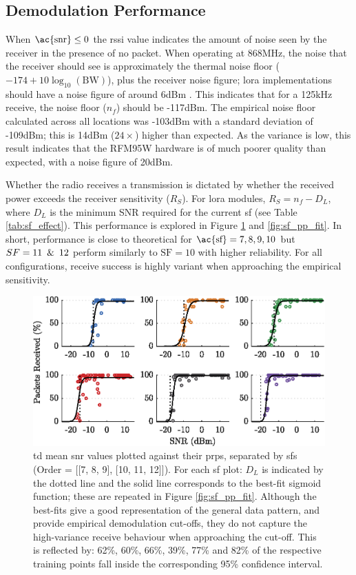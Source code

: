 \subsection{Demodulation Performance}\label{sec:demodulation_performance}
When $\text{\ac{snr}} \leq 0$ the \ac{rssi} value indicates the amount of noise seen by the receiver in the presence of no packet. When operating at 868MHz, the noise that the receiver should see is approximately the thermal noise floor ($-174+10 \log_{10}(\text{BW})$), plus the receiver noise figure; \ac{lora} implementations should have a noise figure of around 6dBm \cite{3YP:LORA_MOD_BASICS}. This indicates that for a 125kHz receive, the noise floor ($n_f$) should be -117dBm. The empirical noise floor calculated across all locations was -103dBm with a standard deviation of -109dBm; this is 14dBm ($24\times$) higher than expected. As the variance is low, this result indicates that the RFM95W hardware is of much poorer quality than expected, with a noise figure of 20dBm.

Whether the radio receives a transmission is dictated by whether the received power exceeds the receiver sensitivity ($R_S$). For \ac{lora} modules, $R_S = n_f - D_L$, where $D_L$ is the minimum SNR required for the current \ac{sf} (see Table \ref{tab:sf_effect}). This performance is explored in Figure \ref{fig:sf_pp_separate} and \ref{fig:sf_pp_fit}. In short, performance is close to theoretical for $\text{\ac{sf}} = 7, 8, 9, 10$ but $SF=11\enskip \& \enskip 12$ perform similarly to $\text{SF}=10$ with higher reliability. For all configurations, receive success is highly variant when approaching the empirical sensitivity.

\begin{figure}[H]
    \centering
   	\includegraphics{Figures/sf_pp_separate_plot}
    \caption[Plots of \ac{snr} vs \ac{prp}]{
   \ac{td} mean \ac{snr} values plotted against their \ac{prp}s, separated by \ac{sf}s (Order = [[7, 8, 9], [10, 11, 12]]). For each \ac{sf} plot: $D_L$ is indicated by the dotted line and the solid line corresponds to the best-fit sigmoid function; these are repeated in Figure \ref{fig:sf_pp_fit}. Although the best-fits give a good representation of the general data pattern, and provide empirical demodulation cut-offs, they do not capture the high-variance receive behaviour when approaching the cut-off. This is reflected by: 62\%, 60\%, 66\%, 39\%, 77\% and 82\% of the respective training points fall inside the corresponding 95\% confidence interval.
    }
    \label{fig:sf_pp_separate}
\end{figure}

